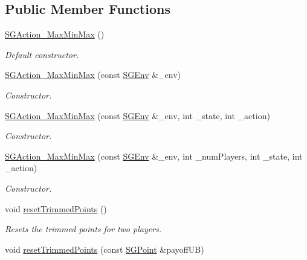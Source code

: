 \subsection*{Public Member Functions}
\begin{DoxyCompactItemize}
\item 
\mbox{\label{classSGAction__MaxMinMax_a4735732a1624affa09ac6ad1e2477431}} 
\hyperlink{classSGAction__MaxMinMax_a4735732a1624affa09ac6ad1e2477431}{S\+G\+Action\+\_\+\+Max\+Min\+Max} ()
\begin{DoxyCompactList}\small\item\em Default constructor. \end{DoxyCompactList}\item 
\hyperlink{classSGAction__MaxMinMax_a1183e22784f865a0478679874a77425e}{S\+G\+Action\+\_\+\+Max\+Min\+Max} (const \hyperlink{classSGEnv}{S\+G\+Env} \&\+\_\+env)
\begin{DoxyCompactList}\small\item\em Constructor. \end{DoxyCompactList}\item 
\hyperlink{classSGAction__MaxMinMax_a51894e40e19b3ec7d90b120f4fada9ed}{S\+G\+Action\+\_\+\+Max\+Min\+Max} (const \hyperlink{classSGEnv}{S\+G\+Env} \&\+\_\+env, int \+\_\+state, int \+\_\+action)
\begin{DoxyCompactList}\small\item\em Constructor. \end{DoxyCompactList}\item 
\hyperlink{classSGAction__MaxMinMax_a7d01d987f83c851e19d3620a27a4d8b0}{S\+G\+Action\+\_\+\+Max\+Min\+Max} (const \hyperlink{classSGEnv}{S\+G\+Env} \&\+\_\+env, int \+\_\+num\+Players, int \+\_\+state, int \+\_\+action)
\begin{DoxyCompactList}\small\item\em Constructor. \end{DoxyCompactList}\item 
void \hyperlink{classSGAction__MaxMinMax_ae7e17727071ae5257c6f28bb5eeb1972}{reset\+Trimmed\+Points} ()
\begin{DoxyCompactList}\small\item\em Resets the trimmed points for two players. \end{DoxyCompactList}\item 
void \hyperlink{classSGAction__MaxMinMax_a76943bc1614a4e3abe153ca6b12faf7c}{reset\+Trimmed\+Points} (const \hyperlink{classSGPoint}{S\+G\+Point} \&payoff\+UB)

\end{DoxyCompactItemize}
